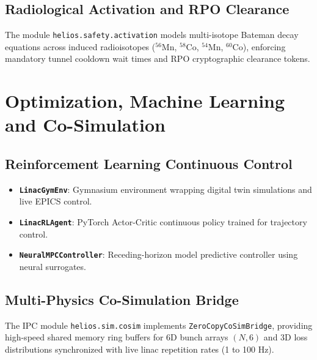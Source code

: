 \documentclass[11pt,a4paper]{report}
\begin{document}
\section{Radiological Activation and RPO Clearance}
The module \texttt{helios.safety.activation} models multi-isotope Bateman decay equations across induced radioisotopes ($^{56}\text{Mn}$, $^{58}\text{Co}$, $^{54}\text{Mn}$, $^{60}\text{Co}$), enforcing mandatory tunnel cooldown wait times and RPO cryptographic clearance tokens.

\chapter{Optimization, Machine Learning and Co-Simulation}

\section{Reinforcement Learning Continuous Control}
\begin{itemize}
    \item \textbf{\texttt{LinacGymEnv}}: Gymnasium environment wrapping digital twin simulations and live EPICS control.
    \item \textbf{\texttt{LinacRLAgent}}: PyTorch Actor-Critic continuous policy trained for trajectory control.
    \item \textbf{\texttt{NeuralMPCController}}: Receding-horizon model predictive controller using neural surrogates.
\end{itemize}

\section{Multi-Physics Co-Simulation Bridge}
The IPC module \texttt{helios.sim.cosim} implements \texttt{ZeroCopyCoSimBridge}, providing high-speed shared memory ring buffers for 6D bunch arrays $(N, 6)$ and 3D loss distributions synchronized with live linac repetition rates (1 to 100 Hz).
\end{document}
